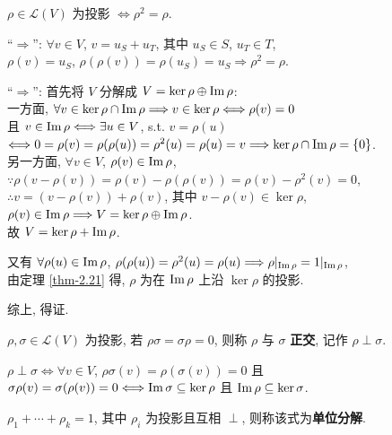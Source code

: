 \documentclass{note}
\begin{document}
\begin{thm}[(课本定理第 3 版 2.22)]
    $\rho\in\mathcal{L}(V)$ 为投影 $\Longleftrightarrow\rho^2=\rho$.
\end{thm}
\begin{pf}
    ``$\Longrightarrow$'': $\forall v\in V$, $v=u_S+u_T$, 其中 $u_S\in S$, $u_T\in T$,\\
    $\rho(v)=u_S$, $\rho(\rho(v))=\rho(u_S)=u_S\Longrightarrow\rho^2=\rho$.

    ``$\Longrightarrow$'': 首先将 $V$ 分解成 $V=\ker\rho\oplus\operatorname{Im}\rho$:\\
    一方面, $\forall v\in\ker\rho\cap\operatorname{Im}\rho\Longrightarrow v\in\ker\rho\Longleftrightarrow\rho(v)=0$\\
    且 $v\in\operatorname{Im}\rho\Longleftrightarrow\exists u\in V$, s.t. $v=\rho(u)$\\
    $\Longleftrightarrow 0=\rho(v)=\rho(\rho(u))=\rho^2(u)=\rho(u)=v\Longrightarrow\ker\rho\cap\operatorname{Im}\rho=\{0\}$.\\
    另一方面, $\forall v\in V$, $\rho(v)\in\operatorname{Im}\rho$,\\
    $\because\rho(v-\rho(v))=\rho(v)-\rho(\rho(v))=\rho(v)-\rho^2(v)=0$, $\therefore v=(v-\rho(v))+\rho(v)$, 其中 $v-\rho(v)\in\ker\rho$, $\rho(v)\in\operatorname{Im}\rho\Longrightarrow V=\ker\rho\oplus\operatorname{Im}\rho$.\\
    故 $V=\ker\rho+\operatorname{Im}\rho$.

    又有 $\forall\rho(u)\in\operatorname{Im}\rho$, $\rho(\rho(u))=\rho^2(u)=\rho(u)\Longrightarrow\rho|_{\operatorname{Im}\rho}=1|_{\operatorname{Im}\rho}$,\\
    由定理 \ref{thm-2.21} 得, $\rho$ 为在 $\operatorname{Im}\rho$ 上沿 $\ker\rho$ 的投影.

    综上, 得证.
\end{pf}

\begin{df}[正交]
    $\rho,\sigma\in\mathcal{L}(V)$ 为投影, 若 $\rho\sigma=\sigma\rho=0$, 则称 $\rho$ 与 $\sigma$ \textbf{正交}, 记作 $\rho\perp\sigma$.
\end{df}

$\rho\perp\sigma\Longleftrightarrow\forall v\in V$, $\rho\sigma(v)=\rho(\sigma(v))=0$ 且 $\sigma\rho(v)=\sigma(\rho(v))=0\Longleftrightarrow\operatorname{Im}\sigma\subseteq\ker\rho$ 且 $\operatorname{Im}\rho\subseteq\ker\sigma$.

\begin{df}[单位分解]
    $\rho_1+\cdots+\rho_k=1$, 其中 $\rho_i$ 为投影且互相 $\perp$, 则称该式为\textbf{单位分解}.
\end{df}
\end{document}
